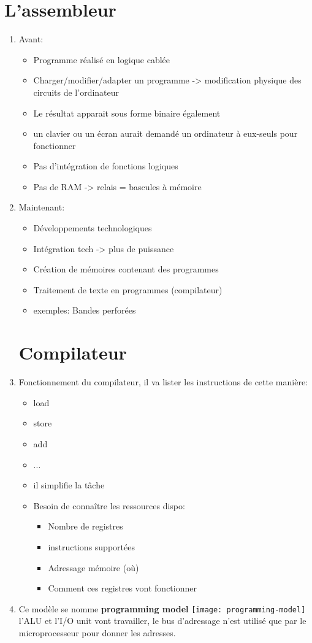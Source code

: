 \section{L'assembleur}
\begin{enumerate}
\item Avant:
\begin{itemize}
  \item Programme réalisé en logique cablée
  \item Charger/modifier/adapter un programme -> modification physique des circuits de l'ordinateur
  \item Le résultat apparait sous forme binaire également
  \item un clavier ou un écran aurait demandé un ordinateur à eux-seuls pour fonctionner
  \item Pas d'intégration de fonctions logiques
  \item Pas de RAM -> relais = bascules à mémoire
\end{itemize}
\item Maintenant:
\begin{itemize}
  \item Développements technologiques
  \item Intégration tech -> plus de puissance
  \item Création de mémoires contenant des programmes
  \item Traitement de texte en programmes (compilateur)
  \item exemples: Bandes perforées
\end{itemize}

\section{Compilateur}
\item Fonctionnement du compilateur, il va lister les instructions de cette manière:
\begin{itemize}
\item load
\item store
\item add
\item ...
\item il simplifie la tâche
\item Besoin de connaître les ressources dispo:
  \begin{itemize}
    \item Nombre de registres
    \item instructions supportées
    \item Adressage mémoire (où)
    \item Comment ces registres vont fonctionner
  \end{itemize}
\end{itemize}
\item Ce modèle se nomme \textbf{programming model}
\centering
\texttt{[image: programming-model]}
\vfill
l'ALU et l'I/O unit vont travailler, le bus d'adressage n'est utilisé que par le microprocesseur pour donner les adresses.
\end{enumerate}

